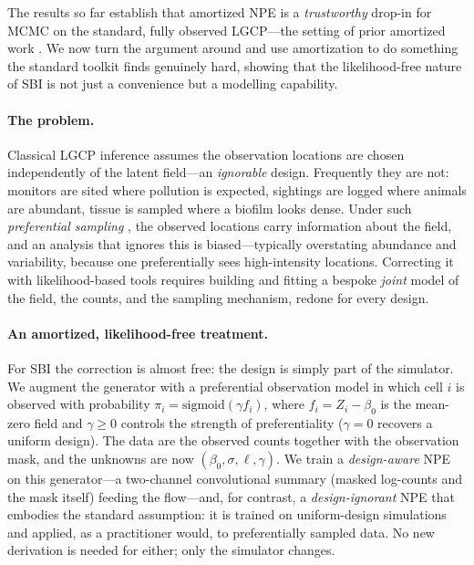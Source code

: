\documentclass[11pt]{article}
\begin{document}
The results so far establish that amortized NPE is a \emph{trustworthy} drop-in
for MCMC on the standard, fully observed LGCP---the setting of prior amortized
work \citep{wang2025inference}. We now turn the argument around and use
amortization to do something the standard toolkit finds genuinely hard, showing
that the likelihood-free nature of SBI is not just a convenience but a modelling
capability.

\paragraph{The problem.}
Classical LGCP inference assumes the observation locations are chosen
independently of the latent field---an \emph{ignorable} design. Frequently they
are not: monitors are sited where pollution is expected, sightings are logged
where animals are abundant, tissue is sampled where a biofilm looks dense. Under
such \emph{preferential sampling} \citep{diggle2010geostatistical}, the observed
locations carry information about the field, and an analysis that ignores this
is biased---typically overstating abundance and variability, because one
preferentially sees high-intensity locations. Correcting it with likelihood-based
tools requires building and fitting a bespoke \emph{joint} model of the field,
the counts, and the sampling mechanism, redone for every design.

\paragraph{An amortized, likelihood-free treatment.}
For SBI the correction is almost free: the design is simply part of the
simulator. We augment the generator with a preferential observation model in
which cell $i$ is observed with probability $\pi_i=\mathrm{sigmoid}(\gamma f_i)$,
where $f_i=Z_i-\beta_0$ is the mean-zero field and $\gamma\ge 0$ controls the
strength of preferentiality ($\gamma=0$ recovers a uniform design). The data are
the observed counts together with the observation mask, and the unknowns are now
$(\beta_0,\sigma,\ell,\gamma)$. We train a \emph{design-aware} NPE on this
generator---a two-channel convolutional summary (masked log-counts and the mask
itself) feeding the flow---and, for contrast, a \emph{design-ignorant} NPE that
embodies the standard assumption: it is trained on uniform-design simulations
and applied, as a practitioner would, to preferentially sampled data. No new
derivation is needed for either; only the simulator changes.
\end{document}
